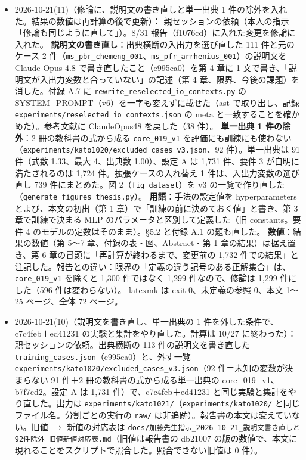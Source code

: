 \documentclass[11pt,a4paper]{jsarticle}
\begin{document}
\begin{itemize}[nosep]
  \item 2026-10-21(11)（修論に、説明文の書き直しと単一出典 1 件の除外を入れた。結果の数値は再計算の後で更新）：
    親セッションの依頼（本人の指示「修論も同じように直して」）。8/31 報告（f1076cd）に入れた変更を修論に入れた。
    \textbf{説明文の書き直し}：出典横断の入出力を選び直した 111 件と元のケース 2 件（\texttt{ms\_pbr\_chemeng\_001}、\texttt{ms\_pfr\_arrhenius\_001}）の説明文を Claude Opus 4.8 で書き直したこと（e995ca0）を第 4 章に 1 文で書き、「説明文が入出力変数と合っていない」の記述（第 4 章、限界、今後の課題）を消した。付録 A.7 に \texttt{rewrite\_reselected\_io\_contexts.py} の SYSTEM\_PROMPT（v6）を一字も変えずに載せた（ast で取り出し、記録 \texttt{experiments/reselected\_io\_contexts.json} の meta と一致することを確かめた）。参考文献に ClaudeOpus48 を戻した（38 件）。
    \textbf{単一出典 1 件の除外}：2 冊の教科書の式から成る \texttt{core\_019\_v1} を評価にも訓練にも使わない（\texttt{experiments/kato1020/excluded\_cases\_v3.json}、92 件）。単一出典は 91 件（式数 1.33、最大 4、出典数 1.00）、設定 A は 1{,}731 件、要件 3 が自明に満たされるのは 1{,}724 件。拡張ケースの入れ替え 1 件は、入出力変数の選び直し 739 件にまとめた。図 2（\texttt{fig\_dataset}）を v3 の一覧で作り直した（\texttt{generate\_figures\_thesis.py}）。
    \textbf{用語}：手法の設定値を hyperparameters とよび、本文の初出（第 1 章）で「訓練の前に決めておく値」と書き、第 3 章で訓練で決まる MLP のパラメータと区別して定義した（旧 constants。要件 4 のモデルの定数はそのまま）。\S 5.2 と付録 A.1 の題も直した。
    \textbf{数値}：結果の数値（第 5〜7 章、付録の表・図、Abstract・第 1 章の結果）は据え置き、第 6 章の冒頭に「再計算が終わるまで、変更前の 1{,}732 件での結果」と注記した。報告との違い：限界の「定義の違う記号のある正解集合」は、\texttt{core\_019\_v1} を除くと 1{,}300 件ではなく 1{,}299 件なので、修論は 1{,}299 件にした（596 件は変わらない）。
    latexmk は exit 0、未定義の参照 0、本文 1〜25 ページ、全体 72 ページ。
  \item 2026-10-21(10)（説明文を書き直し、単一出典の 1 件を外した条件で、c7c4feb＋ed41231 の実験と集計をやり直した。計算は 10/27 に終わった）：
    親セッションの依頼。出典横断の 113 件の説明文を書き直した \texttt{training\_cases.json}（e995ca0）と、外す一覧 \texttt{experiments/kato1020/excluded\_cases\_v3.json}（92 件＝未知の変数が決まらない 91 件＋2 冊の教科書の式から成る単一出典の core\_019\_v1、b7f7cd2。設定 A は 1{,}731 件）で、c7c4feb＋ed41231 と同じ実験と集計をやり直した。出力は \texttt{experiments/kato1021/}（\texttt{experiments/kato1020/} と同じファイル名。分割ごとの実行の \texttt{raw/} は非追跡）。報告書の本文は変えていない。旧値 $\to$ 新値の対応表は \texttt{docs/加藤先生指示\_2026-10-21\_説明文書き直しと92件除外\_旧値新値対応表.md}（旧値は報告書の db21007 の版の数値で、本文に現れることをスクリプトで照合した。照合できない旧値は 0 件）。

\end{itemize}
\end{document}

